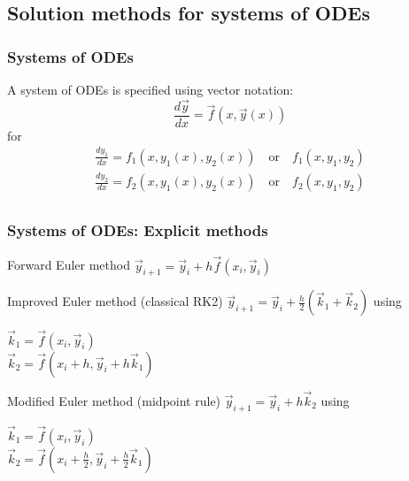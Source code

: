 \documentclass[11pt,table,final,fleqn,xcolor={usenames,dvipsnames,table}]{beamer}
\begin{document}
\subsection{Solution methods for systems of ODEs}
\begin{frame}
  \frametitle{Systems of ODEs}
  A system of ODEs is specified using vector notation:
  \[
    \frac{d\vec{y}}{dx} = \vec{f}(x,\vec{y}(x))
  \]
  for
  \begin{multline*}
    \frac{dy_1}{dx} = f_1(x,y_1(x),y_2(x)) \quad \text{or} \quad f_1(x,y_1,y_2)\\
    \frac{dy_2}{dx} = f_2(x,y_1(x),y_2(x)) \quad \text{or} \quad f_2(x,y_1,y_2)\\
  \end{multline*}
  \pause
\end{frame}

\begin{frame}
  \frametitle{Systems of ODEs: Explicit methods}
  \begin{block}{Forward Euler method}
    $ \displaystyle  \vec{y}_{i+1} = \vec{y}_i + h \vec{f}(x_i,\vec{y}_i) $
  \end{block}
  \begin{block}{Improved Euler method (classical RK2)}
    $\displaystyle \vec{y}_{i+1} = \vec{y}_i + \frac{h}{2}(\vec{k}_1+\vec{k}_2)$
    \quad using \quad \begin{minipage}{0.4\textwidth}
      $\displaystyle \vec{k}_1 = \vec{f}(x_i,\vec{y}_i)$\\
      $\displaystyle \vec{k}_2 = \vec{f}(x_i+h,\vec{y}_i+h\vec{k}_1)$
    \end{minipage}
  \end{block}  
  \begin{block}{Modified Euler method (midpoint rule)}
    $\displaystyle \vec{y}_{i+1} = \vec{y}_i + h\vec{k}_2$
    \quad using \quad \begin{minipage}{0.4\textwidth}
      $\displaystyle \vec{k}_1 = \vec{f}(x_i,\vec{y}_i)$\\
      $\displaystyle \vec{k}_2 = \vec{f}(x_i+\frac{h}{2},\vec{y}_i+\frac{h}{2}\vec{k}_1)$
    \end{minipage}
  \end{block}   
\end{frame}
\end{document}
